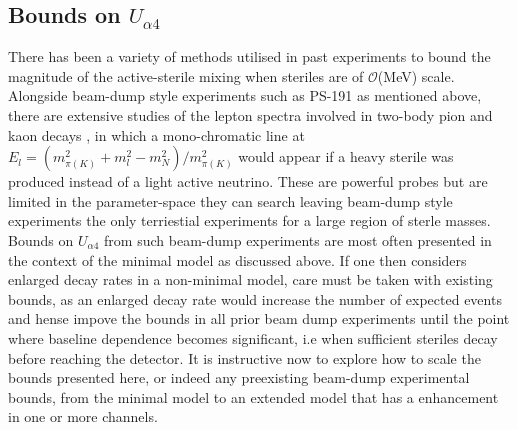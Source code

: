 \documentclass[11pt, a4paper]{article}
\newcommand{\refref}[1]{Ref.~\cite{#1}}
\def\ster{\ensuremath N}
\begin{document}
%
%
\subsection{Bounds on $U_{\alpha 4}$}
There has been a variety of methods utilised in past experiments to bound the magnitude of the active-sterile mixing when steriles are of $\mathcal{O}$(MeV) scale. Alongside beam-dump style experiments such as PS-191 as mentioned above, there are extensive studies of the lepton spectra involved in two-body pion and kaon decays\cite{PhysRevD.46.R885,PhysRevLett.68.3000} 
, in which a mono-chromatic line at $E_l = \left( m_{\pi (K)}^2+m_l^2-m_N^2\right)/m_{\pi(K)}^2$ would appear if a heavy sterile was produced instead of a light active neutrino. These are powerful probes but are limited in the parameter-space they can search leaving beam-dump style experiments the only terriestial experiments for a large region of sterle masses. \\ 

Bounds on $U_{\alpha 4}$ from such beam-dump experiments are most often presented in the context of the minimal model as discussed above. If one then considers enlarged decay rates in a non-minimal model, care must be taken with existing bounds, as an enlarged decay rate would increase the number of expected events and hense impove the bounds in all prior
beam dump experiments until the point where baseline dependence becomes significant, i.e when sufficient steriles decay before reaching the detector. It is instructive now to explore how to scale the bounds
presented here, or indeed any preexisting beam-dump experimental bounds, from
the minimal model to an extended model that has a enhancement in one or more
channels.
\end{document}
